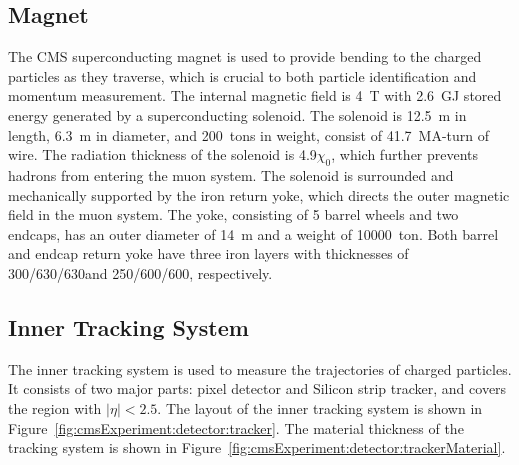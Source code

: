 


\subsection{Magnet}
The CMS superconducting magnet \cite{cms:magnetTdr:Acquistapace:1997fm} is used to provide bending to the charged particles as they traverse, which is crucial to both particle identification and momentum measurement. The internal magnetic field is 4~T with 2.6~GJ stored energy generated by a superconducting solenoid. The solenoid is 12.5~m in length, 6.3~m in diameter, and 200~tons in weight, consist of 41.7~MA-turn of wire. The radiation thickness of the solenoid is 4.9$\chi_0$, which further prevents hadrons from entering the muon system. The solenoid is surrounded and mechanically supported by the iron return yoke, which directs the outer magnetic field in the muon system. The yoke, consisting of 5 barrel wheels and two endcaps, has an outer diameter of 14~m and a weight of 10000~ton. Both barrel and endcap return yoke have three iron layers with thicknesses of 300/630/630\mm and 250/600/600\mm, respectively.


\subsection{Inner Tracking System}
The inner tracking system \cite{cms:trackerTdr:CMS:1997tlf} is used to measure the trajectories of charged particles. It consists of two major parts: pixel detector and Silicon strip tracker, and covers the region with $|\eta|<2.5$. The layout of the inner tracking system is shown in Figure~\ref{fig:cmsExperiment:detector:tracker}.  The material thickness of the tracking system is shown in Figure~\ref{fig:cmsExperiment:detector:trackerMaterial}.


